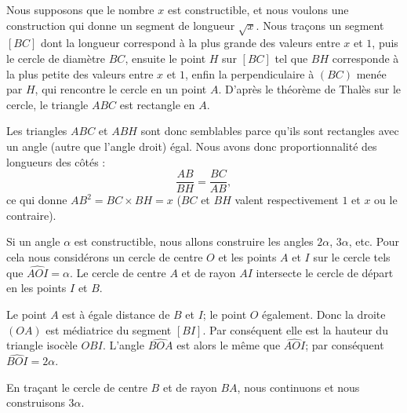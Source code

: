 \begin{example}  \label{ExTYMooSMCvSr}

    Nous supposons que le nombre \( x\) est constructible, et nous voulons une construction qui donne un segment de longueur \( \sqrt{x}\). Nous traçons un segment $[BC]$ dont la longueur correspond à la plus grande des valeurs entre $x$ et $1$, puis le cercle de diamètre $BC$, ensuite le point $H$ sur $[BC]$ tel que $BH$ corresponde à la plus petite des valeurs entre $x$ et $1$, enfin la perpendiculaire à $(BC)$ menée par $H$, qui rencontre le cercle en un point $A$. D'après le théorème de Thalès sur le cercle, le triangle $ABC$ est rectangle en $A$.

    Les triangles \( ABC\) et \( ABH\) sont donc semblables parce qu'ils sont rectangles avec un angle (autre que l'angle droit) égal. Nous avons donc proportionnalité des longueurs des côtés :
    \begin{equation}
        \frac{ AB }{ BH }=\frac{ BC }{ AB },
    \end{equation}
    ce qui donne \( AB^2=BC\times BH=x\) (\( BC\) et \( BH\) valent respectivement \( 1\) et \( x\) ou le contraire).

    \begin{center}
   
    \end{center}

\end{example}

\begin{example} \label{ExAHCooELGGPa}
    Si un angle \( \alpha\) est constructible, nous allons construire les angles \( 2\alpha\), \( 3\alpha\), etc. Pour cela nous considérons un cercle de centre \( O\) et les points \( A\) et \( I\) sur le cercle tels que \( \widehat{AOI}=\alpha\). Le cercle de centre \( A\) et de rayon \( AI\) intersecte le cercle de départ en les points \( I\) et \( B\). 
    
    Le point \( A\) est à égale distance de \( B\) et \( I\); le point \( O\) également. Donc la droite \( (OA)\) est médiatrice du segment \( [BI]\). Par conséquent elle est la hauteur du triangle isocèle \( OBI\). L'angle \( \widehat{BOA}\) est alors le même que \( \widehat{AOI}\); par conséquent \( \widehat{BOI}=2\alpha\).
    
    \begin{center}
        
    \end{center}

    En traçant le cercle de centre \( B\) et de rayon \( BA\), nous continuons et nous construisons \( 3\alpha\).

\end{example}

